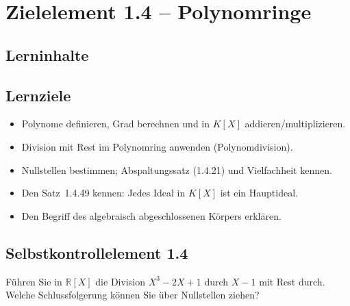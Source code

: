 \documentclass[a4paper,12pt]{article}
\begin{document}
\section*{Zielelement 1.4 -- Polynomringe}

\subsection*{Lerninhalte}
\begin{center}
\end{center}

\subsection*{Lernziele}
\begin{itemize}
  \item Polynome definieren, Grad berechnen und in $K[X]$ addieren/multiplizieren.
  \item Division mit Rest im Polynomring anwenden (Polynomdivision).
  \item Nullstellen bestimmen; Abspaltungssatz (1.4.21) und Vielfachheit kennen.
  \item Den Satz~1.4.49 kennen: Jedes Ideal in $K[X]$ ist ein Hauptideal.
  \item Den Begriff des algebraisch abgeschlossenen Körpers erklären.
\end{itemize}

\subsection*{Selbstkontrollelement 1.4}
Führen Sie in $\mathbb{R}[X]$ die Division $X^3 - 2X + 1$ durch $X - 1$ mit Rest durch.
Welche Schlussfolgerung können Sie über Nullstellen ziehen?
\end{document}
